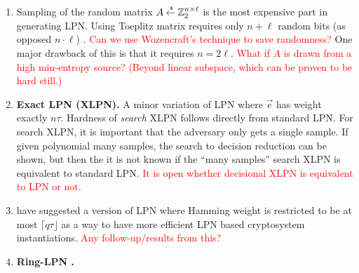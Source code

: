 \begin{enumerate}
	\item Sampling of the random matrix $ A  \mathbin{\stackrel{\mbox{\,\tiny \$}}{\gets}} {\mathbb Z}^{n\times \ell}_2 $ is the most expensive part in generating LPN. 
	Using Toeplitz matrix requires only $ n + \ell $ random bits (as opposed $ n \cdot \ell $) \cite{EC:GilRobSeu08}. 
	\textcolor{red}{Can we use  Wozencraft's technique to save randomness?} 
	One major drawback of this is that it requires $ n = 2 \ell $.
	\textcolor{red}{What if $A$ is drawn from a high min-entropy source? (Beyond linear subspace, which can be proven to be hard still.)}
	
	\item  \textbf{Exact LPN (XLPN).} A minor variation of LPN where $ \vec{e} $ has weight exactly $ n \tau $. 
	Hardness of \textit{search} XLPN follows directly from standard LPN.
	For search XLPN, it is important that the adversary only gets a single sample.
	If given polynomial many samples, the search to decision reduction can be shown, but then the it is not known if the ``many samples'' search XLPN is equivalent to standard LPN.
	\textcolor{red}{It is open whether decisional XLPN is equivalent to LPN or not.}
	
	\item \cite{JC:KatShiSmi10} have suggested a version of LPN where Hamming weight is restricted to be at most $\lceil q\tau \rfloor$ as a way to have more efficient LPN based cryptosystem instantiations.
	\textcolor{red}{Any follow-up/results from this?}
	
	\item \textbf{Ring-LPN \cite{HKLPP12}.} 
	
\end{enumerate} 

